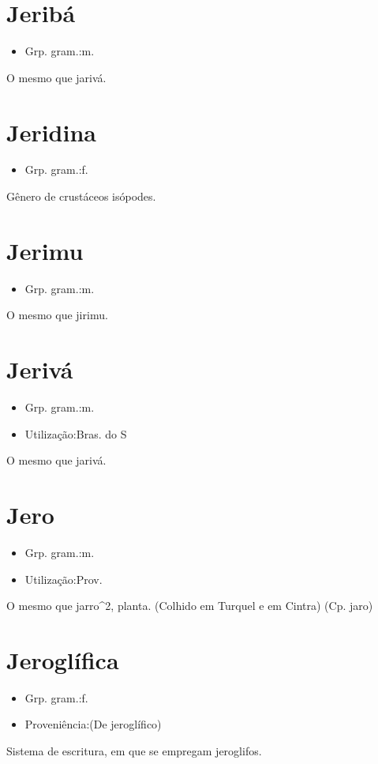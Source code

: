 \documentclass{article}
\begin{document}
\section{Jeribá}
\begin{itemize}
\item {Grp. gram.:m.}
\end{itemize}
O mesmo que \textunderscore jarivá\textunderscore .
\section{Jeridina}
\begin{itemize}
\item {Grp. gram.:f.}
\end{itemize}
Gênero de crustáceos isópodes.
\section{Jerimu}
\begin{itemize}
\item {Grp. gram.:m.}
\end{itemize}
O mesmo que \textunderscore jirimu\textunderscore .
\section{Jerivá}
\begin{itemize}
\item {Grp. gram.:m.}
\end{itemize}
\begin{itemize}
\item {Utilização:Bras. do S}
\end{itemize}
O mesmo que \textunderscore jarivá\textunderscore .
\section{Jero}
\begin{itemize}
\item {Grp. gram.:m.}
\end{itemize}
\begin{itemize}
\item {Utilização:Prov.}
\end{itemize}
O mesmo que \textunderscore jarro\textunderscore ^2, planta. (Colhido em Turquel e em Cintra)
(Cp. \textunderscore jaro\textunderscore )
\section{Jeroglífica}
\begin{itemize}
\item {Grp. gram.:f.}
\end{itemize}
\begin{itemize}
\item {Proveniência:(De \textunderscore jeroglífico\textunderscore )}
\end{itemize}
Sistema de escritura, em que se empregam jeroglifos.
\end{document}
